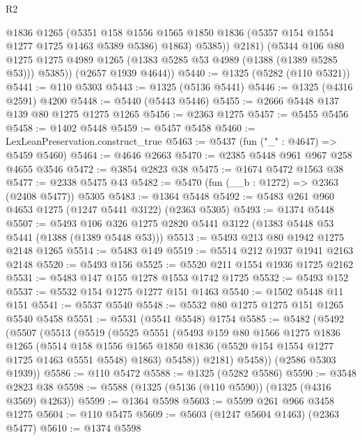 \begin{lexlean}{R2}
\begin{coremodule}
              @1836
              @1265
              (@5351
                @158
                @1556
                @1565
                @1850
                @1836
                (@5357 @154 @1554 @1277 @1725 @1463 @5389 @5386)
                @1863)
              @5385))
          @2181)
        (@5344
          @106
          @80
          @1275
          @1275
          @4989
          @1265
          (@1383 @5285 @53 @4989 (@1388 (@1389 @5285 @53)))
          @5385))
      (@2657 @1939 @4644))
@5440 := @1325 (@5282 (@110 @5321))
@5441 := @110 @5303
@5443 := @1325 (@5136 @5441)
@5446 := @1325 (@4316 @2591) @4200
@5448 := @5440 (@5443 @5446)
@5455 := @2666 @5448 @137 @139 @80 @1275 @1275 @1265
@5456 := @2363 @1275
@5457 := @5455 @5456
@5458 := @1402 @5448
@5459 := @5457 @5458
@5460 := LexLeanPreservation.construct_true
@5463 := @5437 (fun ("_" : @4647) => @5459 @5460)
@5464 := @4646 @2663
@5470 := @2385 @5448 @961 @967 @258 @4655 @3546
@5472 := @3854 @2823 @38
@5475 := @1674 @5472 @1563 @38
@5477 := @2338 @5475 @43
@5482 := @5470 (fun (__b : @1272) => @2363 (@2408 @5477)) @5305
@5483 := @1364 @5448
@5492 := @5483 @261 @960 @4653 @1275 (@1247 @5441 @3122) (@2363 @5305)
@5493 := @1374 @5448
@5507 := @5493 @106 @326 @1275 @2820 @5441 @3122 (@1383 @5448 @53 @5441 (@1388 (@1389 @5448 @53)))
@5513 := @5493 @213 @80 @1942 @1275 @2148 @1265
@5514 := @5483 @149
@5519 := @5514 @212 @1937 @1941 @2163 @2148
@5520 := @5493 @156
@5525 := @5520 @211 @1554 @1936 @1725 @2162
@5531 := @5483 @147 @155 @1278 @1553 @1742 @1725
@5532 := @5493 @152
@5537 := @5532 @154 @1275 @1277 @151 @1463
@5540 := @1502 @5448 @11 @151
@5541 := @5537 @5540
@5548 := @5532 @80 @1275 @1275 @151 @1265 @5540 @5458
@5551 := @5531 (@5541 @5548) @1754
@5585 := @5482
    (@5492
      (@5507
        (@5513
          (@5519
            (@5525
              @5551
              (@5493
                @159
                @80
                @1566
                @1275
                @1836
                @1265
                (@5514
                  @158
                  @1556
                  @1565
                  @1850
                  @1836
                  (@5520 @154 @1554 @1277 @1725 @1463 @5551 @5548)
                  @1863)
                @5458))
            @2181)
          @5458))
      (@2586 @5303 @1939))
@5586 := @110 @5472
@5588 := @1325 (@5282 @5586)
@5590 := @3548 @2823 @38
@5598 := @5588 (@1325 (@5136 (@110 @5590)) (@1325 (@4316 @3569) @4263))
@5599 := @1364 @5598
@5603 := @5599 @261 @966 @3458 @1275
@5604 := @110 @5475
@5609 := @5603 (@1247 @5604 @1463) (@2363 @5477)
@5610 := @1374 @5598

\end{coremodule}
\end{lexlean}

